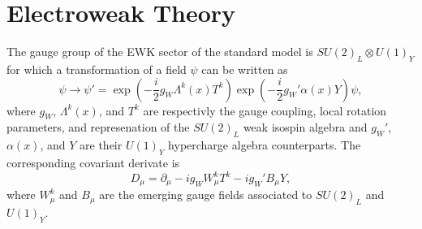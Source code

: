   \section{Electroweak Theory}

    The gauge group of the EWK sector of the standard model is $ SU(2)_L \otimes U(1)_Y $ for which a transformation of a field $ \psi $ can be written as
    \begin{equation}
      \psi \rightarrow \psi' = \exp\left(- \frac{i}{2} g_W \Lambda^k(x) T^k \right) \exp\left(- \frac{i}{2} g_W' \alpha(x) Y \right) \psi ,
    \end{equation}
    where $ g_W $, $ \Lambda^k(x) $, and $ T^k $ are respectivly the gauge coupling, local rotation parameters, and represenation of the $ SU(2)_L $ weak isospin algebra and $ g_W' $, $ \alpha(x) $, and $ Y $ are their $ U(1)_Y $ hypercharge algebra counterparts. The corresponding covariant derivate is
    \begin{equation}
      D_\mu = \partial_\mu - i g_W W^k_\mu T^k - i g_W' B_\mu Y ,
    \end{equation}
    where $ W^k_\mu $ and $ B_\mu$ are the emerging gauge fields associated to $ SU(2)_L $ and $ U(1)_Y $. \\

